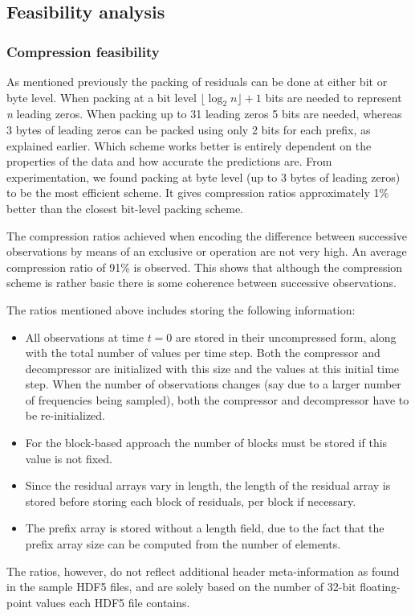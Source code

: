  \subsection{Feasibility analysis}
  \subsubsection{Compression feasibility}
  As mentioned previously the packing of residuals can be done at either bit or byte level. When packing at a bit level $\lfloor\log_2n\rfloor + 1$ bits are needed to represent
  \textit{n} leading zeros. When packing up to 31 leading zeros 5 bits are needed, whereas 3 bytes of leading zeros can be packed using only 2 bits for each prefix, as explained earlier. Which scheme
  works better is entirely dependent on the properties of the data and how accurate the predictions are. From experimentation, we found packing at byte level (up to 3 bytes of leading zeros) to be the most 
  efficient scheme. It gives compression ratios approximately 1\% better than the closest bit-level packing scheme. 
  
  The compression ratios achieved when encoding the difference between successive observations by means of an exclusive or operation are not very high. An average compression ratio of 
  91\% is observed. This shows that although the compression scheme is rather basic there is some coherence between successive observations. 
  
  The ratios mentioned above includes storing the following information:
  \begin{itemize}
   \item All observations at time $t=0$ are stored in their uncompressed form, along with the total number of values per time step. Both the compressor and decompressor are 
   initialized with this size and the values at this initial time step. When the number of observations changes (say due to a larger number of frequencies being sampled), both the
   compressor and decompressor have to be re-initialized.
   \item For the block-based approach the number of blocks must be stored if this value is not fixed.
   \item Since the residual arrays vary in length, the length of the residual array is stored before storing each block of residuals, per block if necessary.
   \item The prefix array is stored without a length field, due to the fact that the prefix array size can be computed from the number of elements.
  \end{itemize}
  The ratios, however, do not reflect additional header meta-information as found in the sample HDF5 files, and are solely based on the number of 32-bit floating-point values each
  HDF5 file contains. 
